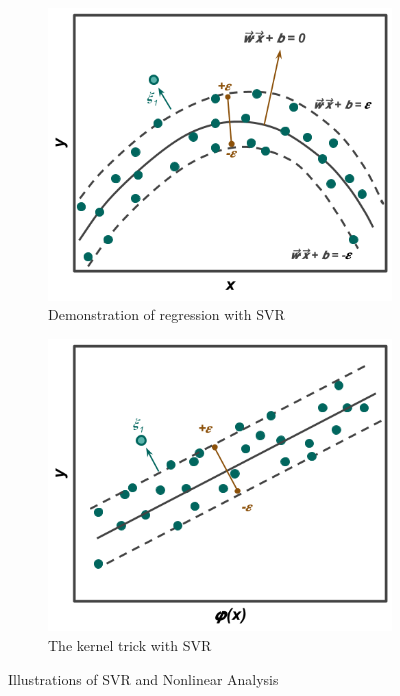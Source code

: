 \begin{figure}[!hp]
  \centering
  \begin{subfigure}[h]{0.8\linewidth}
    \includegraphics[width=\linewidth]{./chapters/litrev/svr-a.png}
    \caption{Demonstration of regression with \gls{SVR}}
    \label{fig:svr-a}
  \end{subfigure}
  \begin{subfigure}[h]{0.8\linewidth}
    \includegraphics[width=\linewidth]{./chapters/litrev/svr-b.png}
    \caption{The kernel trick with \gls{SVR}}
    \label{fig:svr-b}
  \end{subfigure}
  \caption{Illustrations of \gls{SVR} and Nonlinear Analysis}
  \label{fig:svr}
\end{figure}

